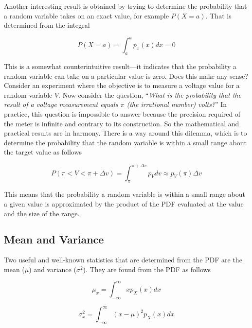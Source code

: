 {Another interesting result is obtained by trying to determine the
probability that a random variable takes on an exact value, for example
$P(X=a)$. That is determined from the
integral

\begin{equation}
\label{equ:integralSliceOfPDFequals0}
P(X=a) = \int^{a}_{a} p_x(x)dx = 0
\end{equation}

This is a somewhat counterintuitive result---it indicates that the
probability a random variable can take on a particular value is zero.
Does this make any sense? Consider an experiment where the objective is
to measure a voltage value for a random variable $V$. Now consider
the question, ``\emph{What is the probability that the result of a
voltage measurement equals $\pi$ (the irrational number) volts?}'' In
practice, this question is impossible to answer because the precision
required of the meter is infinite and contrary to its construction. So
the mathematical and practical results are in harmony. There is a way
around this dilemma, which is to determine the probability that the
random variable is within a small range about the target value as
follows

\begin{equation}
\label{equ:integralDeltaSliceOfPDF}
P(\pi < V < \pi+\Delta v) = \int^{\pi+\Delta v}_{\pi} p_V dv \approx p_V(\pi) \Delta v
\end{equation}

This means that the probability a random variable is within a small
range about a given value is approximated by the product of the PDF
evaluated at the value and the size of the range.

\subsection{Mean and Variance}
\label{subsection:mean-and-variance}

Two useful and well-known statistics that are determined from the PDF
are the mean ($\mu$) and variance ($\sigma^2$). 
They are found from the PDF as follows

\begin{equation}
\label{equ:integralDeltaSliceOfPDF}
\mu_x = \int^{\infty}_{-\infty}xp_X(x)dx
\end{equation}

\begin{equation}
\label{equ:integralDeltaSliceOfPDF}
\sigma^2_x = \int^{\infty}_{-\infty}(x-\mu)^2 p_X(x)dx
\end{equation}

}

